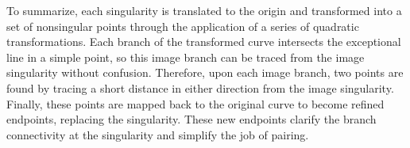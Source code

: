 

To summarize, each singularity is translated to the origin and transformed 
into a set of nonsingular points through the application of a series of quadratic 
transformations.  Each branch of the transformed curve intersects the 
exceptional line in a simple point, so this image branch can be traced
from the image singularity without confusion.
Therefore, upon each image branch, two points are found by tracing a 
short distance in either direction from the image singularity.
Finally, these points are mapped back to the original curve
to become refined endpoints, replacing the singularity.
These new endpoints clarify the branch connectivity at the singularity
and simplify the job of pairing.


